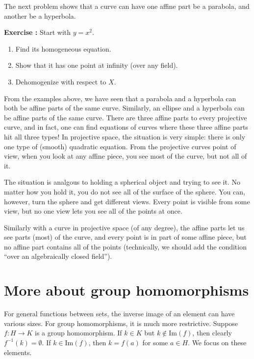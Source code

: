 \documentclass[12pt]{amsart}
\renewcommand{\Im}{\textrm{Im}} %
\newcounter{probs}
\newenvironment{prob}{%
  \refstepcounter{probs}
  \par\medskip\noindent\textbf{Exercise \theprobs:} }{\par\medskip}
\theoremstyle{plain}
\theoremstyle{definition}
\theoremstyle{remark}
\begin{document}
The next problem shows that a curve can have one affine part be a
parabola, and another be a hyperbola.
\begin{prob}
  Start with $y=x^2$.
  \begin{enumerate}
  \item Find its homogeneous equation.
  \item Show that it has one point at infinity (over any field).
  \item Dehomogenize with respect to $X$.
  \end{enumerate}
\end{prob}

From the examples above, we have seen that a parabola and a hyperbola
can both be affine parts of the same curve.  Similarly, an ellipse and
a hyperbola can be affine parts of the same curve.  There are three
affine parts to every projective curve, and in fact, one can find
equations of curves where these three affine parts hit all three
types!  In projective space, the situation is very simple: there is
only one type of (smooth) quadratic equation.  From the projective
curves point of view, when you look at any affine piece, you see most
of the curve, but not all of it.

The situation is analgous to holding a spherical object and trying to
see it.  No matter how you hold it, you do not see all of the surface
of the sphere.  You can, however, turn the sphere and get different
views.  Every point is visible from some view, but no one view lets
you see all of the points at once.

Similarly with a curve in projective space (of any degree), the affine
parts let us see parts (most) of the curve, and every point is in part
of some affine piece, but no affine part contains all of the points
(technically, we should add the condition ``over an algebraically
closed field'').

\section{More about group homomorphisms}
\label{coset-home}

For general functions between sets, the inverse image of an element
can have various sizes.  For group homomorphisms, it is much more
restrictive.  Suppose $f:H\to K$ is a group homomorphism.  If $k\in K$
but $k\not\in\Im(f)$, then clearly $f^{-1}(k)=\emptyset$.  If $k\in
\Im(f)$, then $k=f(a)$ for some $a\in H$.  We focus on these elements.
\end{document}
